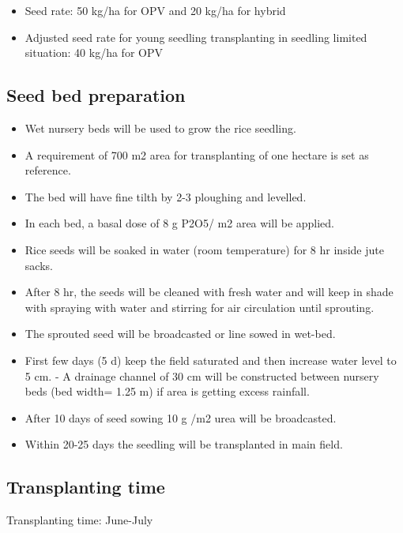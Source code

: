\documentclass[12pt,]{article}
\providecommand{\tightlist}{%
  \setlength{\itemsep}{0pt}\setlength{\parskip}{0pt}}
\begin{document}
\begin{itemize}
\tightlist
\item
  Seed rate: 50 kg/ha for OPV and 20 kg/ha for hybrid
\item
  Adjusted seed rate for young seedling transplanting in seedling limited situation: 40 kg/ha for OPV
\end{itemize}

\hypertarget{seed-bed-preparation}{%
\subsection{Seed bed preparation}\label{seed-bed-preparation}}

\begin{itemize}
\tightlist
\item
  Wet nursery beds will be used to grow the rice seedling.
\item
  A requirement of 700 m2 area for transplanting of one hectare is set as reference.
\item
  The bed will have fine tilth by 2-3 ploughing and levelled.
\item
  In each bed, a basal dose of 8 g P2O5/ m2 area will be applied.
\item
  Rice seeds will be soaked in water (room temperature) for 8 hr inside jute sacks.
\item
  After 8 hr, the seeds will be cleaned with fresh water and will keep in shade with spraying with water and stirring for air circulation until sprouting.
\item
  The sprouted seed will be broadcasted or line sowed in wet-bed.
\item
  First few days (5 d) keep the field saturated and then increase water level to 5 cm. - A drainage channel of 30 cm will be constructed between nursery beds (bed width= 1.25 m) if area is getting excess rainfall.
\item
  After 10 days of seed sowing 10 g /m2 urea will be broadcasted.
\item
  Within 20-25 days the seedling will be transplanted in main field.
\end{itemize}

\hypertarget{transplanting-time}{%
\subsection{Transplanting time}\label{transplanting-time}}

Transplanting time: June-July
\end{document}
